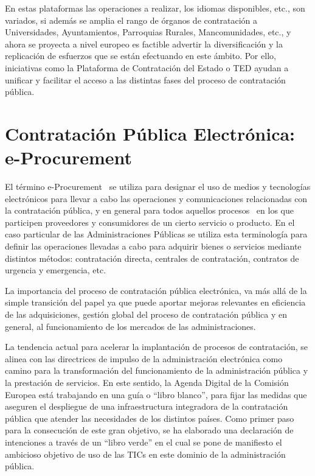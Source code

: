 En estas plataformas las operaciones a realizar, los idiomas disponibles, etc., son variados, si además se amplia el rango
de órganos de contratación a Universidades, Ayuntamientos, Parroquias Rurales, Mancomunidades, etc.,  y ahora se proyecta
a nivel europeo es factible advertir la diversificación y la replicación de esfuerzos que se están efectuando en este ámbito. 
Por ello, iniciativas como la Plataforma de Contratación del Estado o \gls{TED} ayudan a unificar y facilitar el acceso a las distintas fases del proceso
de contratación pública.

\section{Contratación Pública Electrónica: e-Procurement}
El término \gls{e-Procurement}~\cite{Podlogar2007} se utiliza para designar el uso de medios y tecnologías electrónicos para llevar a cabo
las operaciones y comunicaciones relacionadas con la contratación pública, y en general para todos aquellos procesos~\cite{DBLP:journals/tcci/Alor-HernandezAJPRMBG10}
en los que participen proveedores y consumidores de un cierto servicio o producto. En el caso particular de las Administraciones
Públicas se utiliza esta terminología para definir las operaciones llevadas a cabo para adquirir bienes o servicios mediante
distintos métodos: contratación directa, centrales de contratación, contratos de urgencia y emergencia, etc.

La importancia del proceso de contratación pública electrónica, va más allá de la simple transición del papel ya que puede
aportar mejoras relevantes en eficiencia de las adquisiciones, gestión global del proceso de contratación pública y en general, 
al funcionamiento de los mercados de las administraciones.

La tendencia actual para acelerar la implantación de procesos de contratación, se alinea con las directrices de impulso de la administración
electrónica como camino para la transformación del funcionamiento de la administración pública y la prestación de servicios. En este sentido,
la Agenda Digital de la Comisión Europea está trabajando en una guía o ``libro blanco'', para fijar las medidas que aseguren el despliegue
de una infraestructura integradora de la contratación pública que atender las necesidades de los distintos países. Como primer paso para la 
consecución de este gran objetivo, se ha elaborado una declaración de intenciones a través de un ``libro verde'' en el cual se pone de manifiesto el ambicioso objetivo
de uso de las TICs en este dominio de la administración pública. 

